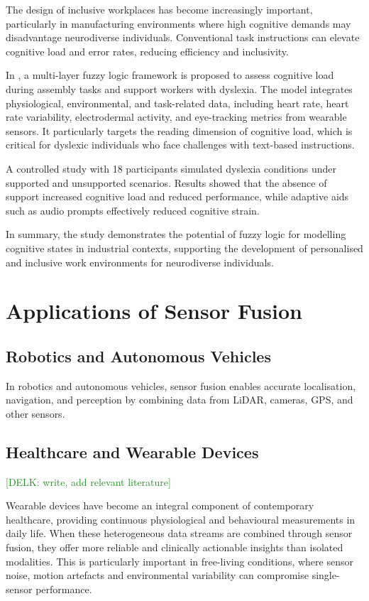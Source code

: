 \documentclass[journal]{IEEEtran}
\newcommand{\KD}[1]{\textcolor{ForestGreen}{{#1}}}
\begin{document}
The design of inclusive workplaces has become increasingly important, particularly in manufacturing environments where high cognitive demands may disadvantage neurodiverse individuals. Conventional task instructions can elevate cognitive load and error rates, reducing efficiency and inclusivity.

In \cite{testa_fuzzyfusion_2025}, a multi-layer fuzzy logic framework is proposed to assess cognitive load during assembly tasks and support workers with dyslexia. The model integrates physiological, environmental, and task-related data, including heart rate, heart rate variability, electrodermal activity, and eye-tracking metrics from wearable sensors. It particularly targets the reading dimension of cognitive load, which is critical for dyslexic individuals who face challenges with text-based instructions.

A controlled study with 18 participants simulated dyslexia conditions under supported and unsupported scenarios. Results showed that the absence of support increased cognitive load and reduced performance, while adaptive aids such as audio prompts effectively reduced cognitive strain.

In summary, the study demonstrates the potential of fuzzy logic for modelling cognitive states in industrial contexts, supporting the development of personalised and inclusive work environments for neurodiverse individuals.

\section{Applications of Sensor Fusion}

\subsection{Robotics and Autonomous Vehicles}
In robotics and autonomous vehicles, sensor fusion enables accurate localisation, navigation, and perception by combining data from LiDAR, cameras, GPS, and other sensors.

\subsection{Healthcare and Wearable Devices} \KD{[DELK: write, add relevant literature]}

Wearable devices have become an integral component of contemporary healthcare, providing continuous physiological and behavioural measurements in daily life. When these heterogeneous data streams are combined through sensor fusion, they offer more reliable and clinically actionable insights than isolated modalities. This is particularly important in free-living conditions, where sensor noise, motion artefacts and environmental variability can compromise single-sensor performance.
\end{document}
